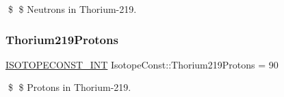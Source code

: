 \$ \$ Neutrons in Thorium-\/219. \mbox{\label{group___isotope_const-_thorium-_th219_ga262a0ee157cefbcde2bf4d08eec4107e}} 
\subsubsection{\texorpdfstring{Thorium219\+Protons}{Thorium219Protons}}
{\footnotesize\ttfamily \mbox{\hyperlink{group___isotope_const-_macros_ga5f18360b3e99483a35c32d789e62621c}{I\+S\+O\+T\+O\+P\+E\+C\+O\+N\+S\+T\+\_\+\+I\+NT}} Isotope\+Const\+::\+Thorium219\+Protons = 90}

\$ \$ Protons in Thorium-\/219. 